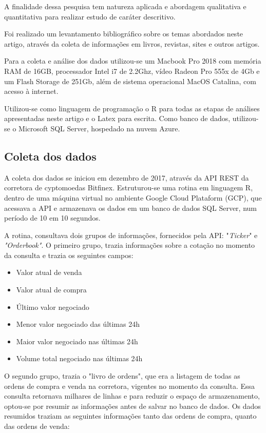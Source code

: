 \documentclass[12pt]{article}
\begin{document}
A finalidade dessa pesquisa tem natureza aplicada e abordagem qualitativa e 
quantitativa para realizar estudo de caráter descritivo.

Foi realizado um levantamento bibliográfico sobre os temas abordados neste 
artigo, através da coleta de informações em livros, revistas, sites e outros 
artigos.

Para a coleta e análise dos dados utilizou-se um Macbook Pro 2018 com memória 
RAM de 16GB, processador Intel i7 de 2.2Ghz, vídeo Radeon Pro 555x de 4Gb e um
Flash Storage de 251Gb, além de sistema operacional MacOS Catalina, com acesso
à internet.

Utilizou-se como linguagem de programação o R \cite{r:2020} para todas as etapas 
de análises apresentadas neste artigo e o Latex \cite{goossens93} para escrita. 
Como banco de dados, utilizou-se o Microsoft SQL Server, hospedado na nuvem 
Azure.

\subsection{Coleta dos dados}

A coleta dos dados se iniciou em dezembro de 2017, através da API REST da 
corretora de cyptomoedas Bitfinex. Estruturou-se uma rotina em linguagem R, 
dentro de uma máquina virtual no ambiente Google Cloud Plataform (GCP), 
que acessava a API e armazenava os dados em um banco de dados SQL Server, 
num período de 10 em 10 segundos.

A rotina, consultava dois grupos de informações, fornecidos pela API: 
"\textit{Ticker}" e \textit{"Orderbook"}. 
O primeiro grupo, trazia informações sobre a cotação no momento da consulta e 
trazia os seguintes campos:

\begin{itemize}
  \item Valor atual de venda
  \item Valor atual de compra
  \item Último valor negociado
  \item Menor valor negociado das últimas 24h
  \item Maior valor negociado nas últimas 24h
  \item Volume total negociado nas últimas 24h
\end{itemize}

O segundo grupo, trazia o "livro de ordens", que era a listagem de todas as 
ordens de compra e venda na corretora, vigentes no momento da consulta. 
Essa consulta retornava milhares de linhas e para reduzir o espaço de 
armazenamento, optou-se por resumir as informações antes de salvar no banco de 
dados. Os dados resumidos traziam as seguintes informações tanto das ordens de 
compra, quanto das ordens de venda:
\end{document}
